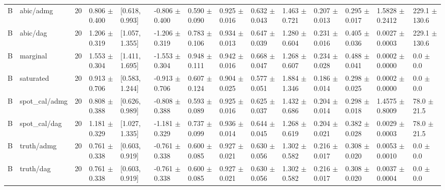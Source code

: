 \begin{table}[t]
\begin{tabular}{@{}llllllllllllll@{}}
B & abic/admg & 20 & 0.806 $\pm$ 0.400 & [0.618, 0.993] & -0.806 $\pm$ 0.400 & 0.590 $\pm$ 0.090 & 0.925 $\pm$ 0.016 & 0.632 $\pm$ 0.043 & 1.463 $\pm$ 0.721 & 0.207 $\pm$ 0.013 & 0.295 $\pm$ 0.017 & 1.5828 $\pm$ 0.2412 & 229.1 $\pm$ 130.6\\
B & abic/dag & 20 & 1.206 $\pm$ 0.319 & [1.057, 1.355] & -1.206 $\pm$ 0.319 & 0.783 $\pm$ 0.106 & 0.934 $\pm$ 0.013 & 0.647 $\pm$ 0.039 & 1.280 $\pm$ 0.604 & 0.231 $\pm$ 0.016 & 0.405 $\pm$ 0.036 & 0.0027 $\pm$ 0.0003 & 229.1 $\pm$ 130.6\\
B & marginal & 20 & 1.553 $\pm$ 0.304 & [1.411, 1.695] & -1.553 $\pm$ 0.304 & 0.948 $\pm$ 0.111 & 0.942 $\pm$ 0.016 & 0.668 $\pm$ 0.047 & 1.268 $\pm$ 0.607 & 0.234 $\pm$ 0.028 & 0.488 $\pm$ 0.041 & 0.0002 $\pm$ 0.0000 & 0.0 $\pm$ 0.0\\
B & saturated & 20 & 0.913 $\pm$ 0.706 & [0.583, 1.244] & -0.913 $\pm$ 0.706 & 0.607 $\pm$ 0.124 & 0.904 $\pm$ 0.025 & 0.577 $\pm$ 0.051 & 1.884 $\pm$ 1.346 & 0.186 $\pm$ 0.014 & 0.298 $\pm$ 0.025 & 0.0002 $\pm$ 0.0000 & 0.0 $\pm$ 0.0\\
B & spot\_cal/admg & 20 & 0.808 $\pm$ 0.388 & [0.626, 0.989] & -0.808 $\pm$ 0.388 & 0.593 $\pm$ 0.089 & 0.925 $\pm$ 0.016 & 0.625 $\pm$ 0.037 & 1.432 $\pm$ 0.686 & 0.204 $\pm$ 0.014 & 0.298 $\pm$ 0.018 & 1.4575 $\pm$ 0.8009 & 78.0 $\pm$ 21.5\\
B & spot\_cal/dag & 20 & 1.181 $\pm$ 0.329 & [1.027, 1.335] & -1.181 $\pm$ 0.329 & 0.737 $\pm$ 0.099 & 0.936 $\pm$ 0.014 & 0.644 $\pm$ 0.045 & 1.268 $\pm$ 0.619 & 0.204 $\pm$ 0.021 & 0.382 $\pm$ 0.028 & 0.0029 $\pm$ 0.0003 & 78.0 $\pm$ 21.5\\
B & truth/admg & 20 & 0.761 $\pm$ 0.338 & [0.603, 0.919] & -0.761 $\pm$ 0.338 & 0.600 $\pm$ 0.085 & 0.927 $\pm$ 0.021 & 0.630 $\pm$ 0.056 & 1.302 $\pm$ 0.582 & 0.216 $\pm$ 0.017 & 0.308 $\pm$ 0.020 & 0.0053 $\pm$ 0.0010 & 0.0 $\pm$ 0.0\\
B & truth/dag & 20 & 0.761 $\pm$ 0.338 & [0.603, 0.919] & -0.761 $\pm$ 0.338 & 0.600 $\pm$ 0.085 & 0.927 $\pm$ 0.021 & 0.630 $\pm$ 0.056 & 1.302 $\pm$ 0.582 & 0.216 $\pm$ 0.017 & 0.308 $\pm$ 0.020 & 0.0037 $\pm$ 0.0004 & 0.0 $\pm$ 0.0\\
\bottomrule
\end{tabular}
\end{table}
